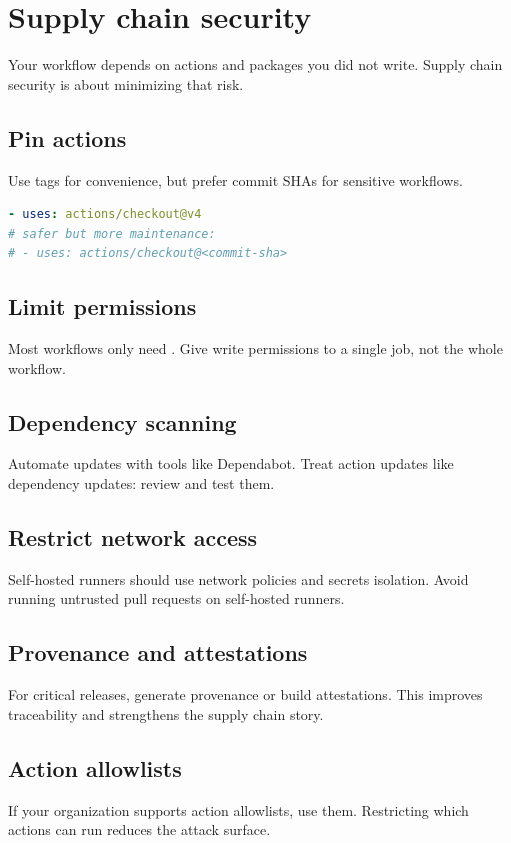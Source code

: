 \chapter{Supply chain security}

Your workflow depends on actions and packages you did not write.
Supply chain security is about minimizing that risk.

\section{Pin actions}
Use tags for convenience, but prefer commit SHAs for sensitive workflows.

\begin{lstlisting}[language=YAML]
- uses: actions/checkout@v4
# safer but more maintenance:
# - uses: actions/checkout@<commit-sha>
\end{lstlisting}

\section{Limit permissions}
Most workflows only need .
Give write permissions to a single job, not the whole workflow.

\section{Dependency scanning}
Automate updates with tools like Dependabot.
Treat action updates like dependency updates: review and test them.

\section{Restrict network access}
Self-hosted runners should use network policies and secrets isolation.
Avoid running untrusted pull requests on self-hosted runners.

\section{Provenance and attestations}
For critical releases, generate provenance or build attestations.
This improves traceability and strengthens the supply chain story.

\section{Action allowlists}
If your organization supports action allowlists, use them.
Restricting which actions can run reduces the attack surface.

